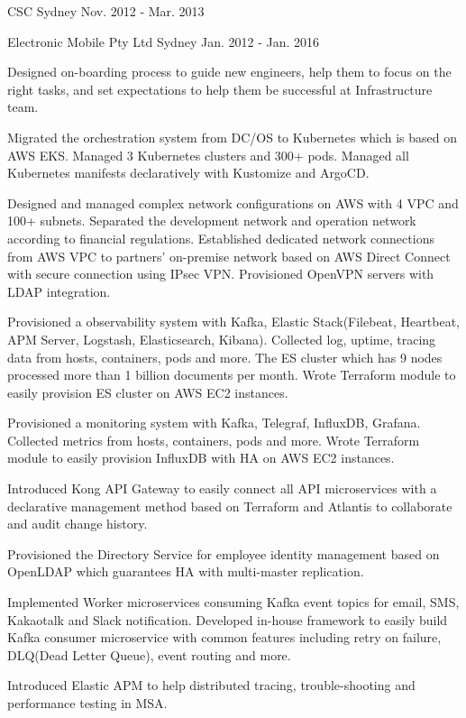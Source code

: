 \begin{cventries}
  {CSC} %
  {Sydney} %
  {Nov. 2012 - Mar. 2013} %
  { }

  {Electronic Mobile Pty Ltd} %
  {Sydney} %
  {Jan. 2012 - Jan. 2016} %
  { \begin{cvitems} %
  \item {Designed on-boarding process to guide new engineers, help them to focus on the right tasks, and set expectations to help them be successful at Infrastructure team.} \item {Migrated the orchestration system from DC/OS to Kubernetes which is based on AWS EKS. Managed 3 Kubernetes clusters and 300+ pods. Managed all Kubernetes manifests declaratively with Kustomize and ArgoCD.} \item {Designed and managed complex network configurations on AWS with 4 VPC and 100+ subnets. Separated the development network and operation network according to financial regulations. Established dedicated network connections from AWS VPC to partners' on-premise network based on AWS Direct Connect with secure connection using IPsec VPN. Provisioned OpenVPN servers with LDAP integration.} \item {Provisioned a observability system with Kafka, Elastic Stack(Filebeat, Heartbeat, APM Server, Logstash, Elasticsearch, Kibana). Collected log, uptime, tracing data from hosts, containers, pods and more. The ES cluster which has 9 nodes processed more than 1 billion documents per month. Wrote Terraform module to easily provision ES cluster on AWS EC2 instances.} \item {Provisioned a monitoring system with Kafka, Telegraf, InfluxDB, Grafana. Collected metrics from hosts, containers, pods and more. Wrote Terraform module to easily provision InfluxDB with HA on AWS EC2 instances.} \item {Introduced Kong API Gateway to easily connect all API microservices with a declarative management method based on Terraform and Atlantis to collaborate and audit change history.} \item {Provisioned the Directory Service for employee identity management based on OpenLDAP which guarantees HA with multi-master replication.} \item {Implemented Worker microservices consuming Kafka event topics for email, SMS, Kakaotalk and Slack notification. Developed in-house framework to easily build Kafka consumer microservice with common features including retry on failure, DLQ(Dead Letter Queue), event routing and more.} \item {Introduced Elastic APM to help distributed tracing, trouble-shooting and performance testing in MSA.}\end{cvitems} }


\end{cventries}
